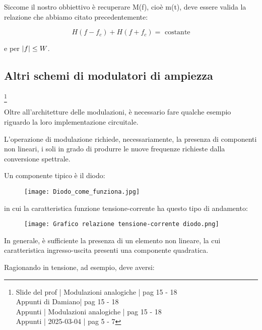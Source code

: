 Siccome il nostro obbiettivo è recuperare M(f), cioè m(t), deve essere valida la relazione che abbiamo citato precedentemente: 

{
    \Large 
    \begin{equation}
        H(f - f_c) 
        + 
        H(f + f_c)
        = 
        \text{ costante} 
    \end{equation}
}

e per $\abs{f} \le W$. \newline 

\newpage 

\subsection{Altri schemi di modulatori di ampiezza}
\footnote{Slide del prof | Modulazioni analogiche | pag 15 - 18\\  
Appunti di Damiano| pag 15 - 18\\
Appunti | Modulazioni analogiche | pag 15 - 18\\
Appunti | 2025-03-04 | pag 5 - 7
} 

Oltre all'architetture delle modulazioni, è necessario fare qualche esempio riguardo la loro implementazione circuitale. \newline 

L'operazione di modulazione richiede, necessariamente, la presenza di componenti non lineari, 
i soli in grado di produrre le nuove frequenze richieste dalla conversione spettrale. \newline 

Un componente tipico è il diodo:  

\begin{figure}[h]
    \centering
    \texttt{[image: Diodo\_come\_funziona.jpg]}
\end{figure} 

in cui la caratteristica funzione tensione-corrente ha questo tipo di andamento:

\begin{figure}[h]
    \centering
    \texttt{[image: Grafico relazione tensione-corrente diodo.png]}
\end{figure} 

In generale, è sufficiente la presenza di un elemento non lineare, 
la cui caratteristica ingresso-uscita presenti una componente quadratica. \newline 

Ragionando in tensione, ad esempio, deve aversi: 

